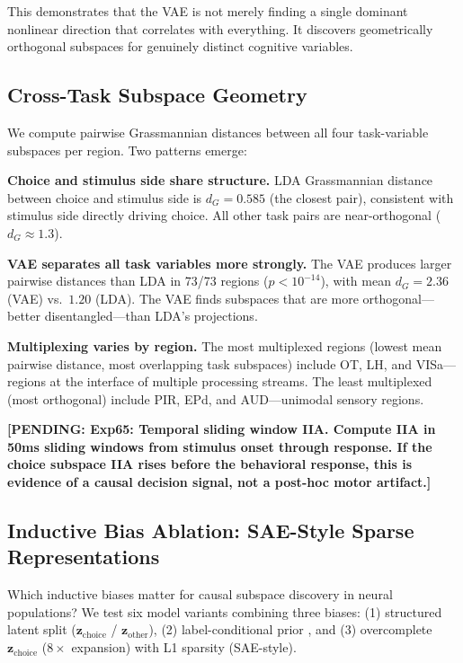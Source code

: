\documentclass{article}
\newcommand{\pending}[1]{\textcolor{red!70!black}{\textbf{[PENDING: #1]}}}
\begin{document}
This demonstrates that the VAE is not merely finding a single dominant nonlinear direction that correlates with everything. It discovers geometrically orthogonal subspaces for genuinely distinct cognitive variables.

\subsection{Cross-Task Subspace Geometry}

We compute pairwise Grassmannian distances between all four task-variable subspaces per region. Two patterns emerge:

\textbf{Choice and stimulus side share structure.} LDA Grassmannian distance between choice and stimulus side is $d_G = 0.585$ (the closest pair), consistent with stimulus side directly driving choice. All other task pairs are near-orthogonal ($d_G \approx 1.3$).

\textbf{VAE separates all task variables more strongly.} The VAE produces larger pairwise distances than LDA in 73/73 regions ($p < 10^{-14}$), with mean $d_G = 2.36$ (VAE) vs.\ $1.20$ (LDA). The VAE finds subspaces that are more orthogonal---better disentangled---than LDA's projections.

\textbf{Multiplexing varies by region.} The most multiplexed regions (lowest mean pairwise distance, most overlapping task subspaces) include OT, LH, and VISa---regions at the interface of multiple processing streams. The least multiplexed (most orthogonal) include PIR, EPd, and AUD---unimodal sensory regions.

\pending{Exp65: Temporal sliding window IIA. Compute IIA in 50ms sliding windows from stimulus onset through response. If the choice subspace IIA rises before the behavioral response, this is evidence of a causal decision signal, not a post-hoc motor artifact.}

\subsection{Inductive Bias Ablation: SAE-Style Sparse Representations}

Which inductive biases matter for causal subspace discovery in neural populations? We test six model variants combining three biases: (1) structured latent split ($\mathbf{z}_{\text{choice}}$ / $\mathbf{z}_{\text{other}}$), (2) label-conditional prior \citep{zhou2020pivae}, and (3) overcomplete $\mathbf{z}_{\text{choice}}$ ($8\times$ expansion) with L1 sparsity (SAE-style).
\end{document}
